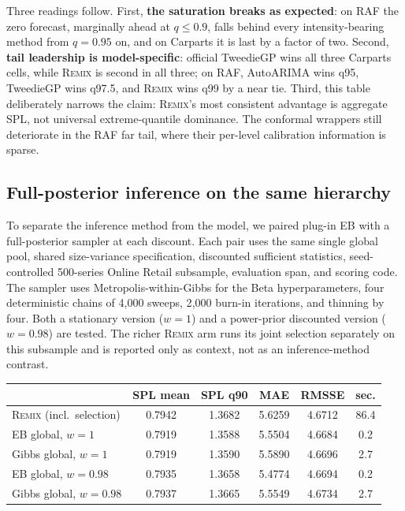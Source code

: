 \documentclass[twocolumn,10pt]{article}
\theoremstyle{definition}
\newcommand{\REMIX}{\textsc{Remix}}
\begin{document}
Three readings follow. First, \textbf{the saturation breaks as expected}:
on RAF the zero forecast, marginally ahead at $q\le0.9$, falls behind
every intensity-bearing method from $q{=}0.95$ on, and on Carparts it is
last by a factor of two. Second, \textbf{tail leadership is
model-specific}: official TweedieGP wins all three Carparts cells, while
\REMIX{} is second in all three; on RAF, AutoARIMA wins q95, TweedieGP
wins q97.5, and \REMIX{} wins q99 by a near tie. Third, this table
deliberately narrows the claim: \REMIX{}'s most consistent advantage is
aggregate SPL, not universal extreme-quantile dominance. The conformal
wrappers still deteriorate in the RAF far tail, where their per-level
calibration information is sparse.

\subsection{Full-posterior inference on the same hierarchy}
\label{app:mcmc}

To separate the inference method from the model, we paired plug-in EB
with a full-posterior sampler at each discount. Each pair uses the same
single global pool, shared size-variance specification, discounted
sufficient statistics, seed-controlled 500-series Online Retail subsample,
evaluation span, and scoring code. The sampler uses
Metropolis-within-Gibbs for the Beta hyperparameters, four deterministic
chains of 4{,}000 sweeps, 2{,}000 burn-in iterations, and thinning by four.
Both a stationary version ($w{=}1$) and a power-prior discounted version
($w{=}0.98$) are tested. The richer \REMIX{} arm runs its joint
selection separately on this subsample and is
reported only as context, not as an inference-method contrast.

\begin{table}[h]
\centering
\small
\begin{tabular}{lccccc}
\toprule
 & SPL mean & SPL q90 & MAE & RMSSE & sec.\\
\midrule
\REMIX{} (incl.\ selection) & 0.7942 & 1.3682 & 5.6259 & 4.6712 & 86.4\\
EB global, $w{=}1$ & 0.7919 & 1.3588 & 5.5504 & 4.6684 & 0.2\\
Gibbs global, $w{=}1$ & 0.7919 & 1.3590 & 5.5890 & 4.6696 & 2.7\\
EB global, $w{=}0.98$ & 0.7935 & 1.3658 & 5.4774 & 4.6694 & 0.2\\
Gibbs global, $w{=}0.98$ & 0.7937 & 1.3665 & 5.5549 & 4.6734 & 2.7\\
\bottomrule
\end{tabular}
\end{table}
\end{document}
